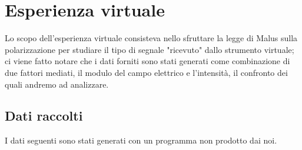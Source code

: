 \documentclass{article}
\theoremstyle{definition}
\begin{document}
\section{Esperienza virtuale}
Lo scopo dell'esperienza virtuale consisteva nello sfruttare la legge di Malus sulla polarizzazione per studiare il tipo di segnale "ricevuto" dallo strumento virtuale; ci viene fatto notare che i dati forniti sono stati generati come combinazione di due fattori mediati, il modulo del campo elettrico e l'intensità, il confronto dei quali andremo ad analizzare.\\


\subsection{Dati raccolti}
I dati seguenti sono stati generati con un programma non prodotto dai noi.
\end{document}
